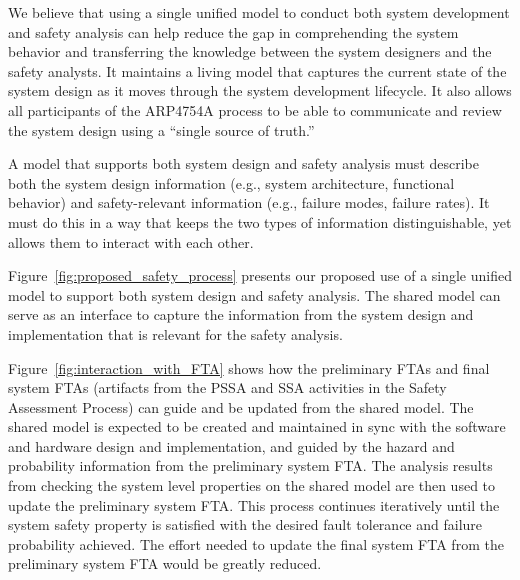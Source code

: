 We believe that using a single unified model to conduct both system development and safety analysis can help reduce the gap in comprehending the system behavior and transferring the knowledge between the system designers and the safety analysts. It maintains a living model that captures the current state of the system design as it moves through the system development lifecycle.
It also allows all participants of the ARP4754A process to be able to communicate and review the system design using a ``single source of truth.''

A model that supports both system design and safety analysis must describe both the system design information (e.g., system architecture, functional behavior) and safety-relevant information (e.g., failure modes, failure rates).  It must do this in a way that keeps the two types of information distinguishable, yet allows them to interact with each other.

Figure~\ref{fig:proposed_safety_process} presents our proposed use of a single unified model to support both system design and safety analysis.  The shared model can serve as an interface to capture the information from the system design and implementation that is relevant for the safety analysis.

Figure~\ref{fig:interaction_with_FTA} shows how the preliminary FTAs and final system FTAs (artifacts from the PSSA and SSA activities in the Safety Assessment Process) can guide and be updated from the shared model.
The shared model is expected to be created and maintained in sync with the software and hardware design and implementation, and guided by the hazard and probability information from the preliminary system FTA. The analysis results from checking the system level properties on the shared model are then used to update the preliminary system FTA. This process continues iteratively until the system safety property is satisfied with the desired fault tolerance and failure probability achieved. The effort needed to update the final system FTA from the preliminary system FTA would be greatly reduced.

